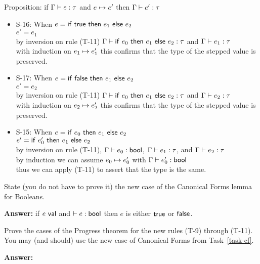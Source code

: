 \documentclass{article}
\begin{document}
Proposition: if $\Gamma \vdash e : \tau$ and $e \mapsto e'$ then $\Gamma \vdash e' : \tau$
\begin{itemize}
    \item S-16: When $e = \mathsf{if}~\mathsf{true}~\mathsf{then}~e_1~\mathsf{else}~e_2$\\ \step $e' = e_1$\\
        by inversion on rule (T-11) $\Gamma \vdash \mathsf{if}~e_0~\mathsf{then}~e_1~\mathsf{else}~e_2 : \tau$ 
            and  $\Gamma \vdash e_1 : \tau$\\
        with induction on $e_1 \mapsto e_1'$ this confirms that the type of the stepped value is preserved.
        
    \item S-17: When $e = \mathsf{if}~\mathsf{false}~\mathsf{then}~e_1~\mathsf{else}~e_2$\\ \step $e' = e_2$\\
        by inversion on rule (T-11) $\Gamma \vdash \mathsf{if}~e_0~\mathsf{then}~e_1~\mathsf{else}~e_2 : \tau$ 
            and  $\Gamma \vdash e_2 : \tau$\\
        with induction on $e_2 \mapsto e_2'$ this confirms that the type of the stepped value is preserved.
    
    \item S-15: When $e = \mathsf{if}~e_0~\mathsf{then}~e_1~\mathsf{else}~e_2$\\ \step $e' = \mathsf{if}~e_0'~\mathsf{then}~e_1~\mathsf{else}~e_2$\\
        by inversion on rule (T-11), $\Gamma \vdash e_0 : \mathsf{bool}$, $\Gamma \vdash e_1 : \tau$, 
            and $\Gamma \vdash e_2 : \tau$\\
        by induction we can assume $e_0 \mapsto e_0'$ with $\Gamma \vdash e_0' : \mathsf{bool}$\\
        thus we can apply (T-11) to assert that the type is the same.
\end{itemize}

\begin{task}\label{task-cf}
  State (you do not have to prove it) the new case of the Canonical Forms
  lemma for Booleans.
\end{task}

\textbf{Answer:}
if $e ~\mathsf{val}$ and $ \vdash e : \mathsf{bool}$ then $e$ is either $\mathsf{true}$ or $\mathsf{false}$.


\begin{task}
  Prove the cases of the Progress theorem for the new rules
  (T-9) through (T-11). You may (and should) use the new case of Canonical
  Forms from Task~\ref{task-cf}.
\end{task}

\textbf{Answer:}
\end{document}
